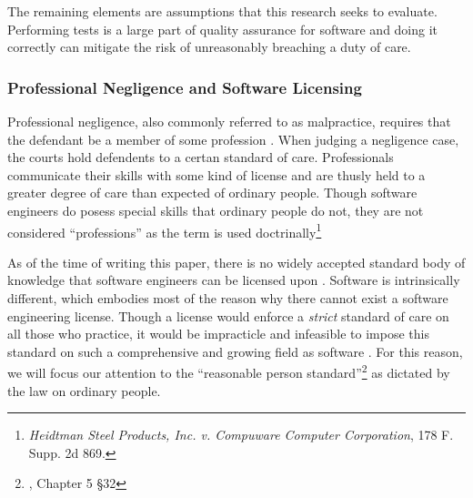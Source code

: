 The remaining elements are assumptions that this research seeks to evaluate.
Performing tests is a large part of quality assurance for software and doing it
correctly can mitigate the risk of unreasonably breaching a duty of care.

\subsubsection{Professional Negligence and Software Licensing}
Professional negligence, also commonly referred to as malpractice, requires that
the defendant be a member of some profession \cite{Kaner96}. When judging a
negligence case, the courts hold defendents to a certan standard of care.
Professionals communicate their skills with some kind of license and are thusly
held to a greater degree of care than expected of ordinary people. Though
software engineers do posess special skills that ordinary people do not, they
are not considered ``professions'' as the term is used
doctrinally\footnote{\textit{Heidtman Steel Products, Inc. v. Compuware Computer
Corporation}, 178 F. Supp. 2d 869.}

As of the time of writing this paper, there is no widely accepted standard body
of knowledge that software engineers can be licensed upon \cite{Knight02}.
Software is intrinsically different, which embodies most of the reason why there
cannot exist a software engineering license. Though a license would enforce a
\textit{strict} standard of care on all those who practice, it would be
impracticle and infeasible to impose this standard on such a comprehensive and
growing field as software \cite{Knight02}. For this reason, we will focus our
attention to the ``reasonable person standard''\footnote{\cite{Prosser}, Chapter
5 \S 32} as dictated by the law on ordinary people.

